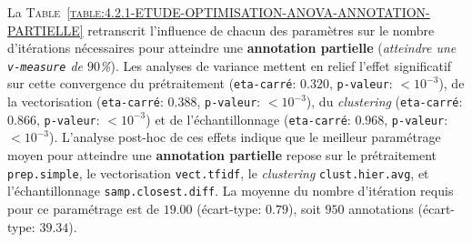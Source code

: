 			La \textsc{Table~\ref{table:4.2.1-ETUDE-OPTIMISATION-ANOVA-ANNOTATION-PARTIELLE}} retranscrit l'influence de chacun des paramètres sur le nombre d'itérations nécessaires pour atteindre une \textbf{annotation partielle} (\textit{atteindre une \texttt{v-measure} de $90$\%}).
			Les analyses de variance mettent en relief l'effet significatif sur cette convergence du prétraitement (\texttt{eta-carré}: $0.320$, \texttt{p-valeur}: $< 10^{-3}$), de la vectorisation (\texttt{eta-carré}: $0.388$, \texttt{p-valeur}: $< 10^{-3}$), du \textit{clustering} (\texttt{eta-carré}: $0.866$, \texttt{p-valeur}: $< 10^{-3}$) et de l'échantillonnage (\texttt{eta-carré}: $0.968$, \texttt{p-valeur}: $< 10^{-3}$).
			L'analyse post-hoc de ces effets indique que le meilleur paramétrage moyen pour atteindre une \textbf{annotation partielle} repose sur le prétraitement \texttt{prep.simple}, le vectorisation \texttt{vect.tfidf}, le \textit{clustering} \texttt{clust.hier.avg}, et l'échantillonnage \texttt{samp.closest.diff}. La moyenne du nombre d'itération requis pour ce paramétrage est de $19.00$ (écart-type: $0.79$), soit $950$ annotations (écart-type: $39.34$).
